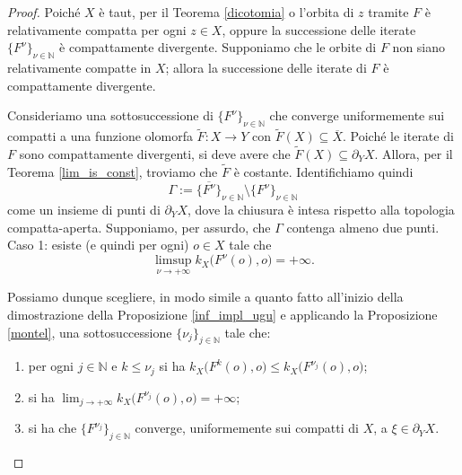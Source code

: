 \begin{proof}
    Poiché $X$ è taut, per il Teorema \ref{dicotomia} o l'orbita di $z$ tramite $F$ è relativamente compatta per ogni $z \in X$, oppure la successione delle iterate $\{F^\nu\}_{\nu\in\mathbb{N}}$ è compattamente divergente. Supponiamo che le orbite di $F$ non siano relativamente compatte in $X$; allora la successione delle iterate di $F$ è compattamente divergente.

    Consideriamo una sottosuccessione di $\{F^\nu\}_{\nu\in\mathbb{N}}$ che converge uniformemente sui compatti a una funzione olomorfa $\tilde{F}:X \rightarrow Y$ con $\tilde{F}(X)\subseteq\overline{X}$. Poiché le iterate di $F$ sono compattamente divergenti, si deve avere che $\tilde{F}(X)\subseteq\partial_YX$. Allora, per il Teorema \ref{lim_is_const}, troviamo che $\tilde{F}$ è costante. Identifichiamo quindi
    $$\Gamma:=\overline{\{F^\nu\}}_{\nu\in\mathbb{N}}\setminus\{F^\nu\}_{\nu\in\mathbb{N}}$$
    come un insieme di punti di $\partial_YX$, dove la chiusura è intesa rispetto alla topologia compatta-aperta. Supponiamo, per assurdo, che $\Gamma$ contenga almeno due punti. \\

    Caso 1: esiste (e quindi per ogni) $o \in X$ tale che
    $$\limsup_{\nu\longrightarrow+\infty} k_X\big(F^\nu(o),o\big)=+\infty.$$

    Possiamo dunque scegliere, in modo simile a quanto fatto all'inizio della dimostrazione della Proposizione \ref{inf_impl_ugu} e applicando la Proposizione \ref{montel}, una sottosuccessione $\{\nu_j\}_{j\in\mathbb{N}}$ tale che:
    \begin{enumerate}[label={(\arabic*)}]
        \item per ogni $j\in\mathbb{N}$ e $k\le\nu_j$ si ha $k_X\big(F^k(o),o\big) \le k_X\big(F^{\nu_j}(o),o\big)$;
        \item si ha $\displaystyle\lim_{j\longrightarrow+\infty}k_X\big(F^{\nu_j}(o),o\big)=+\infty$;
        \item si ha che $\{F^{\nu_j}\}_{j\in\mathbb{N}}$ converge, uniformemente sui compatti di $X$, a $\xi\in\partial_YX$.
    \end{enumerate}


\end{proof}
